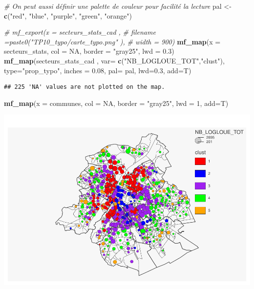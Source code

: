 \documentclass[
]{book}
\newenvironment{Shaded}{\begin{snugshade}}{\end{snugshade}}
\newcommand{\AttributeTok}[1]{\textcolor[rgb]{0.13,0.29,0.53}{#1}}
\newcommand{\CommentTok}[1]{\textcolor[rgb]{0.56,0.35,0.01}{\textit{#1}}}
\newcommand{\ConstantTok}[1]{\textcolor[rgb]{0.56,0.35,0.01}{#1}}
\newcommand{\DecValTok}[1]{\textcolor[rgb]{0.00,0.00,0.81}{#1}}
\newcommand{\FloatTok}[1]{\textcolor[rgb]{0.00,0.00,0.81}{#1}}
\newcommand{\FunctionTok}[1]{\textcolor[rgb]{0.13,0.29,0.53}{\textbf{#1}}}
\newcommand{\NormalTok}[1]{#1}
\newcommand{\OtherTok}[1]{\textcolor[rgb]{0.56,0.35,0.01}{#1}}
\newcommand{\StringTok}[1]{\textcolor[rgb]{0.31,0.60,0.02}{#1}}
\begin{document}
\begin{Shaded}
\begin{Highlighting}[]
\CommentTok{\# On peut aussi définir une palette de couleur pour facilité la lecture}
\NormalTok{pal }\OtherTok{\textless{}{-}} \FunctionTok{c}\NormalTok{(}\StringTok{"red"}\NormalTok{, }\StringTok{"blue"}\NormalTok{, }\StringTok{"purple"}\NormalTok{, }\StringTok{"green"}\NormalTok{, }\StringTok{"orange"}\NormalTok{)}

\CommentTok{\# mf\_export(x = secteurs\_stats\_cad ,}
\CommentTok{\#           filename =paste0("TP10\_typo/carte\_typo.png" ),}
\CommentTok{\#           width = 900)}
\FunctionTok{mf\_map}\NormalTok{(}\AttributeTok{x =}\NormalTok{ secteurs\_stats, }\AttributeTok{col =} \ConstantTok{NA}\NormalTok{, }\AttributeTok{border =} \StringTok{"gray25"}\NormalTok{, }\AttributeTok{lwd =} \FloatTok{0.3}\NormalTok{)}
\FunctionTok{mf\_map}\NormalTok{(secteurs\_stats\_cad ,}
       \AttributeTok{var=} \FunctionTok{c}\NormalTok{(}\StringTok{"NB\_LOGLOUE\_TOT"}\NormalTok{,}\StringTok{"clust"}\NormalTok{),}
       \AttributeTok{type=}\StringTok{"prop\_typo"}\NormalTok{,}
       \AttributeTok{inches =} \FloatTok{0.08}\NormalTok{,}
       \AttributeTok{pal=}\NormalTok{ pal,}
       \AttributeTok{lwd=}\FloatTok{0.3}\NormalTok{,}
       \AttributeTok{add=}\NormalTok{T)}
\end{Highlighting}
\end{Shaded}

\begin{verbatim}
## 225 'NA' values are not plotted on the map.
\end{verbatim}

\begin{Shaded}
\begin{Highlighting}[]
\FunctionTok{mf\_map}\NormalTok{(}\AttributeTok{x =}\NormalTok{ communes, }\AttributeTok{col =} \ConstantTok{NA}\NormalTok{, }\AttributeTok{border =} \StringTok{"gray25"}\NormalTok{, }\AttributeTok{lwd =} \DecValTok{1}\NormalTok{, }\AttributeTok{add=}\NormalTok{T)}
\end{Highlighting}
\end{Shaded}

\includegraphics{manuel_geo_quanti_files/figure-latex/unnamed-chunk-105-1.pdf}
\end{document}
